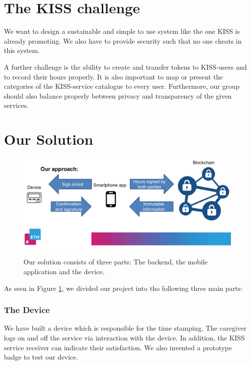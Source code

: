 \documentclass[12pt]{report}
\begin{document}
\section{The KISS challenge}

We want to design a sustainable and simple to use system like the one KISS is already promoting. We also have to provide security such that no one cheats in this system.

A further challenge is the ability to create and transfer tokens to KISS-users and to record their hours properly. It is also important to map or present the categories of the KISS-service catalogue to every user.
Furthermore, our group should also balance properly between privacy and transparency of the given services.

\section{Our Solution}

\begin{figure}[h]
    \centering
    \caption{Our solution consists of three parts: The backend, the mobile application and the device.}
    \includegraphics[width=12cm]{blockchain.png}
    \label{blockchain}
\end{figure}

As seen in Figure \ref{blockchain}, we divided our project into tho following three main parts:

\subsubsection{The Device}
We have built a device which is responsible for the time stamping. The caregiver logs on and off the service via interaction with the device. In addition, the KISS service receiver can indicate their satisfaction. We also invented a prototype badge to test our device.
\end{document}
